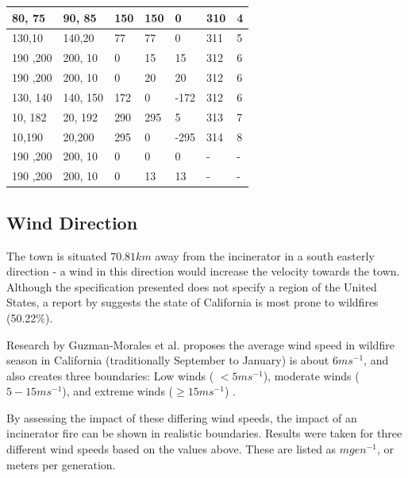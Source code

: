 \documentclass[11pt, a4paper, titlepage]{article}
\begin{document}
\begin{table}[H]
\begin{tabular}{|l|l|l|l|l|l|l|}
    80, 75   & 90, 85       & 150                          & 150      & 0        & 310           & 4   \\ \hline
    130,10   & 140,20       & 77                           & 77       & 0        & 311           & 5   \\ \hline
    190 ,200 & 200, 10      & 0                            & 15       & 15       & 312           & 6   \\ \hline
    190 ,200 & 200, 10      & 0                            & 20       & 20       & 312           & 6   \\ \hline
    130, 140 & 140, 150     & 172                          & 0        & -172     & 312           & 6   \\ \hline
    10, 182  & 20, 192      & 290                          & 295      & 5        & 313           & 7   \\ \hline
    10,190   & 20,200       & 295                          & 0        & -295     & 314           & 8   \\ \hline
    190 ,200 & 200, 10      & 0                            & 0        & 0        & -             & -   \\ \hline
    190 ,200 & 200, 10      & 0                            & 13       & 13       & -             & -   \\ \hline
    \end{tabular}
    \end{table}

  \subsection{Wind Direction}
  The town is situated $70.81km$ away from the incinerator in a south easterly direction - a wind in this direction would increase the velocity towards the town. Although the specification presented does not specify a region of the United States, a report by \cite{Thompson2011} suggests the state of California is most prone to wildfires (50.22\%). 
  
  Research by Guzman-Morales et al. proposes the average wind speed in wildfire season in California (traditionally September to January) is about $6ms^{-1}$, and also creates three boundaries: Low winds ( $< 5ms^{-1}$), moderate winds ($ 5 - 15 ms^{-1}$), and extreme winds ($ \geq 15ms^{-1}$) \cite{doi:10.1002/2016GL067887}. 
  
  By assessing the impact of these differing wind speeds, the impact of an incinerator fire can be shown in realistic boundaries. Results were taken for three different wind speeds based on the values above. These are listed as $mgen^{-1}$, or meters per generation.
\end{document}
